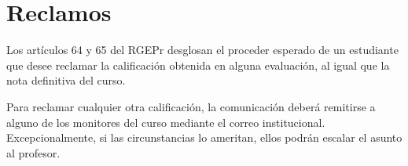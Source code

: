 \section{Reclamos}
Los artículos 64 y 65 del RGEPr desglosan el proceder esperado de un estudiante que desee reclamar la calificación obtenida en alguna evaluación, al igual que la nota definitiva del curso.

Para reclamar cualquier otra calificación, la comunicación deberá remitirse a alguno de los monitores del curso mediante el correo institucional. Excepcionalmente, si las circunstancias lo ameritan, ellos podrán escalar el asunto al profesor.
